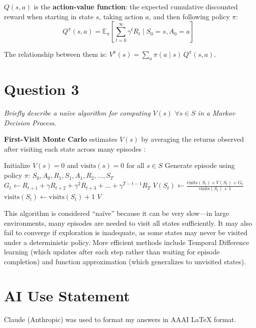 \documentclass[letterpaper]{article}
\begin{document}
$Q(s, a)$ is the \textbf{action-value function}: the expected cumulative discounted reward when starting in state $s$, taking action $a$, and then following policy $\pi$:
\[
Q^\pi(s, a) = \mathbb{E}_\pi\left[\sum_{t=0}^{\infty} \gamma^t R_t \mid S_0 = s, A_0 = a\right]
\]

The relationship between them is: $V^\pi(s) = \sum_a \pi(a \mid s) \, Q^\pi(s, a)$.

\section*{Question 3}
\textit{Briefly describe a na\"ive algorithm for computing $V(s)$ $\forall s \in S$ in a Markov Decision Process.}

\vspace{0.5em}

\textbf{First-Visit Monte Carlo} estimates $V(s)$ by averaging the returns observed after visiting each state across many episodes \citep{sutton2018reinforcement}:

\begin{algorithmic}[1]
\State Initialize $V(s) = 0$ and $\text{visits}(s) = 0$ for all $s \in S$
    \State Generate episode using policy $\pi$: $S_0, A_0, R_1, S_1, A_1, R_2, \ldots, S_T$
        \State $G_t \gets R_{t+1} + \gamma R_{t+2} + \gamma^2 R_{t+3} + \ldots + \gamma^{T-t-1} R_T$
        \State $V(S_t) \gets \frac{\text{visits}(S_t) \times V(S_t) + G_t}{\text{visits}(S_t) + 1}$
        \State $\text{visits}(S_t) \gets \text{visits}(S_t) + 1$
    \EndFor
\EndFor
\State \Return $V$
\end{algorithmic}

\vspace{0.5em}

This algorithm is considered ``na\"ive'' because it can be very slow---in large environments, many episodes are needed to visit all states sufficiently. It may also fail to converge if exploration is inadequate, as some states may never be visited under a deterministic policy. More efficient methods include Temporal Difference learning (which updates after each step rather than waiting for episode completion) and function approximation (which generalizes to unvisited states).

\section*{AI Use Statement}

Claude (Anthropic) was used to format my answers in AAAI LaTeX format.


\end{document}
